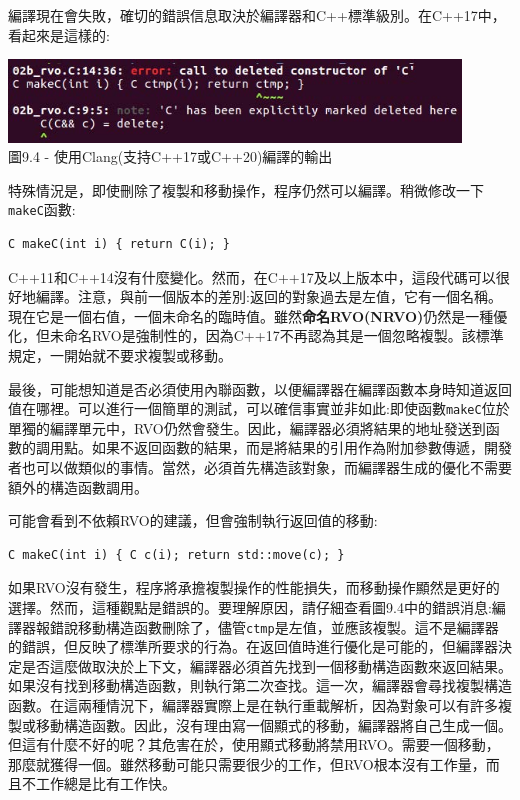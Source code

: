 編譯現在會失敗，確切的錯誤信息取決於編譯器和C++標準級別。在C++17中，看起來是這樣的:

\begin{center}
\includegraphics[width=0.9\textwidth]{content/3/chapter9/images/4.jpg}\\
圖9.4 - 使用Clang(支持C++17或C++20)編譯的輸出
\end{center}

特殊情況是，即使刪除了複製和移動操作，程序仍然可以編譯。稍微修改一下\texttt{makeC}函數:

\begin{lstlisting}[style=styleCXX]
C makeC(int i) { return C(i); }
\end{lstlisting}

C++11和C++14沒有什麼變化。然而，在C++17及以上版本中，這段代碼可以很好地編譯。注意，與前一個版本的差別:返回的對象過去是左值，它有一個名稱。現在它是一個右值，一個未命名的臨時值。雖然\textbf{命名RVO(NRVO)}仍然是一種優化，但未命名RVO是強制性的，因為C++17不再認為其是一個忽略複製。該標準規定，一開始就不要求複製或移動。 

最後，可能想知道是否必須使用內聯函數，以便編譯器在編譯函數本身時知道返回值在哪裡。可以進行一個簡單的測試，可以確信事實並非如此:即使函數\texttt{makeC}位於單獨的編譯單元中，RVO仍然會發生。因此，編譯器必須將結果的地址發送到函數的調用點。如果不返回函數的結果，而是將結果的引用作為附加參數傳遞，開發者也可以做類似的事情。當然，必須首先構造該對象，而編譯器生成的優化不需要額外的構造函數調用。 

可能會看到不依賴RVO的建議，但會強制執行返回值的移動:

\begin{lstlisting}[style=styleCXX]
C makeC(int i) { C c(i); return std::move(c); }
\end{lstlisting}

如果RVO沒有發生，程序將承擔複製操作的性能損失，而移動操作顯然是更好的選擇。然而，這種觀點是錯誤的。要理解原因，請仔細查看圖9.4中的錯誤消息:編譯器報錯說移動構造函數刪除了，儘管\texttt{ctmp}是左值，並應該複製。這不是編譯器的錯誤，但反映了標準所要求的行為。在返回值時進行優化是可能的，但編譯器決定是否這麼做取決於上下文，編譯器必須首先找到一個移動構造函數來返回結果。如果沒有找到移動構造函數，則執行第二次查找。這一次，編譯器會尋找複製構造函數。在這兩種情況下，編譯器實際上是在執行重載解析，因為對象可以有許多複製或移動構造函數。因此，沒有理由寫一個顯式的移動，編譯器將自己生成一個。但這有什麼不好的呢？其危害在於，使用顯式移動將禁用RVO。需要一個移動，那麼就獲得一個。雖然移動可能只需要很少的工作，但RVO根本沒有工作量，而且不工作總是比有工作快。

